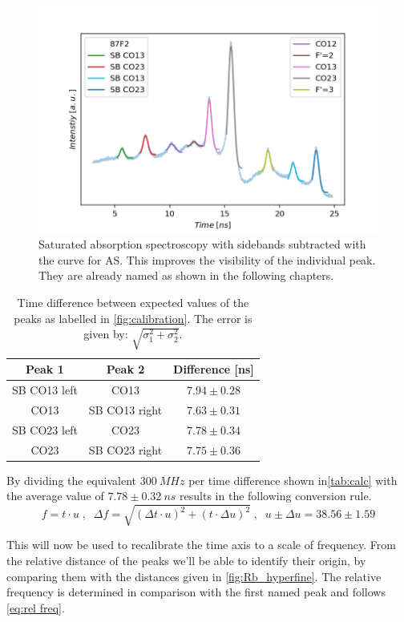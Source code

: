 \documentclass[]{article}
\begin{document}
\begin{figure}[H]
\centering
\includegraphics[width=.8\textwidth]{Plots/Calibration_Second_Real.png}
\caption{Saturated absorption spectroscopy with sidebands subtracted with the curve for AS. This improves the visibility of the individual peak. They are already named as shown in the following chapters.}
\label{fig:calibration}
\end{figure}

\begin{table}[H]
\centering
\begin{tabular}{c|c|c}

Peak 1 & Peak 2 & Difference [ns] \\ \hline\hline
SB CO13 left & CO13 & $7.94 \pm 0.28$ \\
CO13 & SB CO13 right & $7.63 \pm 0.31$ \\ \hline 
SB CO23 left & CO23  & $7.78 \pm 0.34$ \\
CO23 & SB CO23 right & $7.75 \pm 0.36$

\end{tabular}
\caption{Time difference between expected values of the peaks as labelled in \autoref{fig:calibration}. The error is given by: $\sqrt{\sigma_1^2 + \sigma_2^2}$.}
\label{tab:calc}
\end{table}

By dividing the equivalent $300\ MHz$ per time difference shown in\autoref{tab:calc} with the average value of $7.78 \pm 0.32\ ns$ results in the following conversion rule.
\begin{equation}
f=t\cdot u \;,\;\; \Delta f = \sqrt{(\Delta t \cdot u)^2+ (t \cdot \Delta u)^2} \;,\;\; u\pm\Delta u= 38.56 \pm 1.59
\label{eq:conversion rule}
\end{equation}


This will now be used to recalibrate the time axis to a scale of frequency. From the relative distance of the peaks we'll be able to identify their origin, by comparing them with the distances given in \autoref{fig:Rb_hyperfine}. 
The relative frequency is determined in comparison with the first named peak and follows \autoref{eq:rel freq}.
\end{document}
